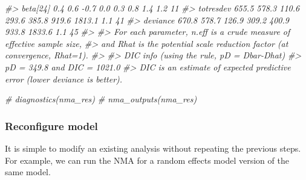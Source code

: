\documentclass[
]{article}
\newenvironment{Shaded}{\begin{snugshade}}{\end{snugshade}}
\newcommand{\CommentTok}[1]{\textcolor[rgb]{0.56,0.35,0.01}{\textit{#1}}}
\begin{document}
\begin{Shaded}
\begin{Highlighting}[]
\CommentTok{\#\textgreater{} beta[24]    0.4   0.6  {-}0.7   0.0   0.3   0.8    1.4  1.2    11}
\CommentTok{\#\textgreater{} totresdev 655.5 578.3 110.6 293.6 385.8 919.6 1813.1  1.1    41}
\CommentTok{\#\textgreater{} deviance  670.8 578.7 126.9 309.2 400.9 933.8 1833.6  1.1    45}
\CommentTok{\#\textgreater{} }
\CommentTok{\#\textgreater{} For each parameter, n.eff is a crude measure of effective sample size,}
\CommentTok{\#\textgreater{} and Rhat is the potential scale reduction factor (at convergence, Rhat=1).}
\CommentTok{\#\textgreater{} }
\CommentTok{\#\textgreater{} DIC info (using the rule, pD = Dbar{-}Dhat)}
\CommentTok{\#\textgreater{} pD = 349.8 and DIC = 1021.0}
\CommentTok{\#\textgreater{} DIC is an estimate of expected predictive error (lower deviance is better).}

\CommentTok{\# diagnostics(nma\_res)}
\CommentTok{\# nma\_outputs(nma\_res)}
\end{Highlighting}
\end{Shaded}

\hypertarget{reconfigure-model}{%
\subsubsection{Reconfigure model}\label{reconfigure-model}}

It is simple to modify an existing analysis without repeating the
previous steps. For example, we can run the NMA for a random effects
model version of the same model.
\end{document}
